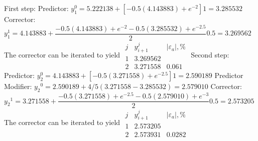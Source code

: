 \documentclass[../main.tex]{subfiles}
\begin{document}
\begin{enumerate}[label=\bfseries(\alph*)]
\begin{blockquote}
\end{blockquote}
	\bigbreak
\end{enumerate}




\section{}
First step:
	\bigbreak
Predictor:
	\bigbreak
$y_{1}^{0}=5.222138+\left[-0.5(4.143883)+e^{-2}\right] 1=3.285532$
	\bigbreak
Corrector:
	\bigbreak
$y_{1}^{1}=4.143883+\dfrac{-0.5(4.143883)+e^{-2}-0.5(3.285532)+e^{-2.5}}{2} 0.5=3.269562$
	\bigbreak
The corrector can be iterated to yield
	\bigbreak
$
\begin{array}{ccc}
j & y_{i+1}^{j} & \left|\varepsilon_{a}\right|, \% \\ 
1 & 3.269562 & \\
 2 & 3.271558 & 0.061
\end{array}
$
	\bigbreak
Second step:
	\bigbreak
Predictor:
	\bigbreak
$y_{2}^{0}=4.143883+\left[-0.5(3.271558)+e^{-2.5}\right] 1=2.590189$
	\bigbreak
Predictor Modifier:
	\bigbreak
$y_{2}{ }^{0}=2.590189+4 / 5(3.271558-3.285532)=2.579010$
	\bigbreak
Corrector:
	\bigbreak
$y_{2}{ }^{1}=3.271558+\dfrac{-0.5(3.271558)+e^{-2.5}-0.5(2.579010)+e^{-3}}{2} 0.5=2.573205$
	\bigbreak
The corrector can be iterated to yield
	\bigbreak
$
\begin{array}{ccc}
j & y_{i+1}^{j} & \left|\varepsilon_{a}\right|, \% \\
1 & 2.573205 & \\
2 & 2.573931 & 0.0282
\end{array}
$
	\bigbreak
\end{document}
